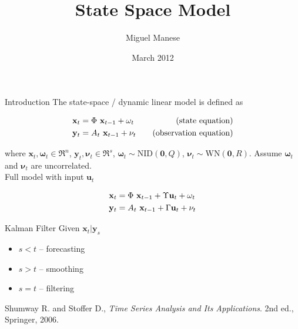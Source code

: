 \documentclass{article}
\title{State Space Model}
\author{Miguel Manese}
\date{March 2012}
\begin{document}
\maketitle

\begin{section}{Introduction}
\noindent The state-space / dynamic linear model is defined as

\begin{alignat}{2}
\mathbf{x}_t &= \Phi~\mathbf{x}_{t-1} + \mathbf{\omega}_t & 
   \quad\text{(state equation)}\notag\\
\mathbf{y}_t &= A_t~\mathbf{x}_{t-1} + \mathbf{\nu}_t &
   \quad\text{(observation equation)}\notag
\end{alignat}

\noindent where $\mathbf{x}_t, \mathbf{\omega}_t \in \Re^n$, 
$\mathbf{y}_t, \mathbf{\nu}_t \in \Re^s$, 
$\mathbf{\omega}_t \sim \mathrm{NID}(\mathbf{0}, Q)$,
$\mathbf{\nu}_t \sim \mathrm{WN}(\mathbf{0},R)$. Assume $\mathbf{\omega}_t$
and $\mathbf{\nu}_t$ are uncorrelated.\\

\noindent Full model with input $\mathbf{u}_t$

\begin{alignat}{2}
\mathbf{x}_t &= \Phi~\mathbf{x}_{t-1} + \Upsilon \mathbf{u}_t + 
                \mathbf{\omega}_t \notag\\
\mathbf{y}_t &= A_t~\mathbf{x}_{t-1} + \Gamma \mathbf{u}_t +
                \mathbf{\nu}_t \notag
\end{alignat}


\end{section}

\begin{section}{Kalman Filter}
\noindent Given $\mathbf{x}_t | \mathbf{y}_s$
\begin{itemize}
\item $s < t$ -- forecasting
\item $s > t$ -- smoothing
\item $s = t$ -- filtering
\end{itemize}


\end{section}

\begin{thebibliography}{99}
Shumway R. and Stoffer D.,
\emph{Time Series Analysis and Its Applications}. 2nd ed.,
Springer, 2006.
\end{thebibliography}
\end{document}
